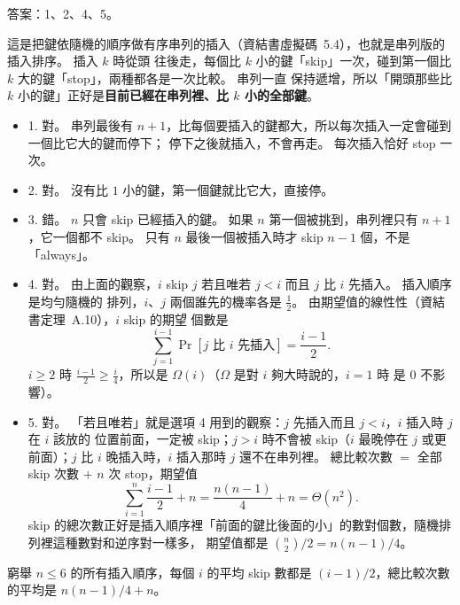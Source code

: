 \begin{pastsoln}
答案：1、2、4、5。

這是把鍵依隨機的順序做有序串列的插入（資結書虛擬碼~5.4），也就是串列版的插入排序。 插入 $k$ 時從頭
往後走，每個比 $k$ 小的鍵「skip」一次，碰到第一個比 $k$ 大的鍵「stop」，兩種都各是一次比較。 串列一直
保持遞增，所以「開頭那些比 $k$ 小的鍵」正好是\textbf{目前已經在串列裡、比 $k$ 小的全部鍵}。

\begin{itemize}
\item 1. 對。 串列最後有 $n + 1$，比每個要插入的鍵都大，所以每次插入一定會碰到一個比它大的鍵而停下；
停下之後就插入，不會再走。 每次插入恰好 stop 一次。
\item 2. 對。 沒有比 $1$ 小的鍵，第一個鍵就比它大，直接停。
\item 3. 錯。 $n$ 只會 skip 已經插入的鍵。 如果 $n$ 第一個被挑到，串列裡只有 $n + 1$，它一個都不 skip。
只有 $n$ 最後一個被插入時才 skip $n - 1$ 個，不是「always」。
\item 4. 對。 由上面的觀察，$i$ skip $j$ 若且唯若 $j < i$ 而且 $j$ 比 $i$ 先插入。 插入順序是均勻隨機的
排列，$i$、$j$ 兩個誰先的機率各是 $\frac{1}{2}$。 由期望值的線性性（資結書定理~A.10），$i$ skip 的期望
個數是
\[
\sum_{j=1}^{i-1} \Pr[j \text{ 比 } i \text{ 先插入}] = \frac{i - 1}{2}.
\]
$i \ge 2$ 時 $\frac{i-1}{2} \ge \frac{i}{4}$，所以是 $\Omega(i)$（$\Omega$ 是對 $i$ 夠大時說的，$i = 1$ 時
是 $0$ 不影響）。
\item 5. 對。 「若且唯若」就是選項 4 用到的觀察：$j$ 先插入而且 $j < i$，$i$ 插入時 $j$ 在 $i$ 該放的
位置前面，一定被 skip；$j > i$ 時不會被 skip（$i$ 最晚停在 $j$ 或更前面）；$j$ 比 $i$ 晚插入時，$i$
插入那時 $j$ 還不在串列裡。 總比較次數 $=$ 全部 skip 次數 $+$ $n$ 次 stop，期望值
\[
\sum_{i=1}^{n} \frac{i-1}{2} + n = \frac{n(n-1)}{4} + n = \Theta(n^2).
\]
skip 的總次數正好是插入順序裡「前面的鍵比後面的小」的數對個數，隨機排列裡這種數對和逆序對一樣多，
期望值都是 $\binom{n}{2}/2 = n(n-1)/4$。
\end{itemize}
窮舉 $n \le 6$ 的所有插入順序，每個 $i$ 的平均 skip 數都是 $(i-1)/2$，總比較次數的平均是
$n(n-1)/4 + n$。
\end{pastsoln}
